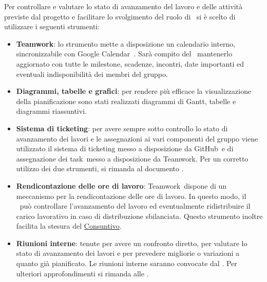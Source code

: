 \documentclass[../PianoProgetto.tex]{subfiles}
\begin{document}
Per controllare e valutare lo stato di avanzamento del lavoro e delle attività previste dal progetto e facilitare lo svolgimento del ruolo di \responsabilediprogetto\ si è scelto di utilizzare i seguenti strumenti:
	\begin{itemize}
	\item \textbf{Teamwork}: lo strumento mette a disposizione un calendario interno, sincronizzabile con Google Calendar\g\ . Sarà compito del \responsabilediprogetto\ mantenerlo aggiornato con tutte le milestone\g, scadenze, incontri, date importanti ed eventuali indisponibilità dei membri del gruppo.
	\item \textbf{Diagrammi, tabelle e grafici}: per rendere più efficace la visualizzazione della pianificazione sono stati realizzati diagrammi di Gantt, tabelle e diagrammi riassuntivi.
	\item \textbf{Sistema di ticketing}: per avere sempre sotto controllo lo stato di avanzamento dei lavori e le assegnazioni ai vari componenti del gruppo viene utilizzato il sistema di ticketing messo a disposizione da GitHub\g\ e di assegnazione dei task\g\ messo a disposizione da Teamwork\g. Per un corretto utilizzo dei due strumenti, si rimanda al documento \normediprogettov .
	\item \textbf{Rendicontazione delle ore di lavoro}: Teamwork\g\ dispone di un meccanismo per la rendicontazione delle ore di lavoro. In questo modo, il \responsabilediprogetto\ può controllare l'avanzamento del lavoro ed eventualmente ridistribuire il carico lavorativo in caso di distribuzione sbilanciata. Questo strumento inoltre facilita la stesura del \hyperref[sec:consuntivo]{Consuntivo}.
	\item \textbf{Riunioni interne}: tenute per avere un confronto diretto, per valutare lo stato di avanzamento dei lavori e per prevedere migliorie o variazioni a quanto già pianificato. Le riunioni interne saranno convocate dal \responsabilediprogetto . Per ulteriori approfondimenti si rimanda alle \normediprogetto .
	\end{itemize}
	
\end{document}
